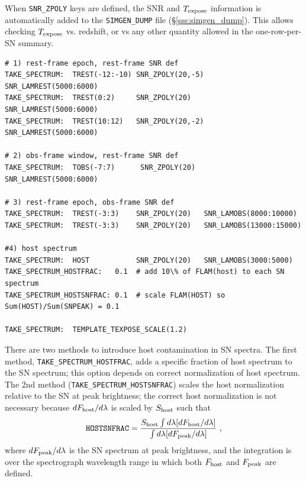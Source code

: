 \documentclass[12pt]{article}
\newcommand{\Texpose}{T_{\rm expose}}
\newcommand{\lam}{\lambda}
\begin{document}
When {\tt SNR\_ZPOLY} keys are defined, the SNR and $\Texpose$
information is automatically added to the {\tt SIMGEN\_DUMP}
file (\S\ref{sss:simgen_dump}).
This allows checking $\Texpose$ vs. redshift, or vs
any other quantity allowed in the one-row-per-SN summary.

\begin{Verbatim}[frame=single]
# 1) rest-frame epoch, rest-frame SNR def
TAKE_SPECTRUM:  TREST(-12:-10) SNR_ZPOLY(20,-5)  SNR_LAMREST(5000:6000)
TAKE_SPECTRUM:  TREST(0:2)     SNR_ZPOLY(20)     SNR_LAMREST(5000:6000)
TAKE_SPECTRUM:  TREST(10:12)   SNR_ZPOLY(20,-2)  SNR_LAMREST(5000:6000)

# 2) obs-frame window, rest-frame SNR def
TAKE_SPECTRUM:  TOBS(-7:7)      SNR_ZPOLY(20)    SNR_LAMREST(5000:6000)

# 3) rest-frame epoch, obs-frame SNR def
TAKE_SPECTRUM:  TREST(-3:3)    SNR_ZPOLY(20)   SNR_LAMOBS(8000:10000)
TAKE_SPECTRUM:  TREST(-3:3)    SNR_ZPOLY(20)   SNR_LAMOBS(13000:15000)

#4) host spectrum 
TAKE_SPECTRUM:  HOST           SNR_ZPOLY(20)   SNR_LAMOBS(3000:5000)
TAKE_SPECTRUM_HOSTFRAC:   0.1  # add 10\% of FLAM(host) to each SN spectrum
TAKE_SPECTRUM_HOSTSNFRAC: 0.1  # scale FLAM(HOST) so Sum(HOST)/Sum(SNPEAK) = 0.1

TAKE_SPECTRUM:  TEMPLATE_TEXPOSE_SCALE(1.2)
\end{Verbatim}


\medskip
\newcommand{\scaleFlamHost}{S_{\rm host}}
\newcommand{\dFlamHost}{dF_{\rm host}/d\lam}
\newcommand{\dFlamPeak}{dF_{\rm peak}/d\lam}
There are two methods to introduce host contamination in SN spectra.
The first method, {\tt TAKE\_SPECTRUM\_HOSTFRAC}, adds a specific fraction
of host spectrum to the SN spectrum; this option depends on correct
normalization of host spectrum. 
The 2nd method ({\tt TAKE\_SPECTRUM\_HOSTSNFRAC}) scales the host 
normalization relative to the SN at peak brightness;
the correct host normalization is not necessary because 
$\dFlamHost$ is scaled by $\scaleFlamHost$ such that
\begin{equation}
   {\rm\tt HOSTSNFRAC} =      
    \frac{\scaleFlamHost\int d\lam [\dFlamHost]}{ \int d\lam [\dFlamPeak ]}~,
\end{equation}
%
where $\dFlamPeak$ is the SN spectrum at peak brightness,
and the integration is over the spectrograph wavelength range
in which both $F_{\rm host}$ and $F_{\rm peak}$ are defined.
\end{document}
